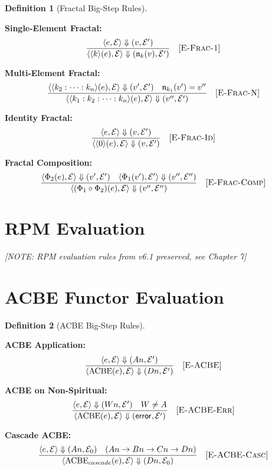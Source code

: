 \documentclass[11pt,twoside,openright]{book}
\theoremstyle{definition}
\newtheorem{definition}{Definition}[chapter]
\theoremstyle{plain}
\theoremstyle{remark}
\newcommand{\Frac}{\Phi}
\newcommand{\bigstep}{\Downarrow}
\begin{document}
\begin{definition}[Fractal Big-Step Rules]
\label{def:fractal-bigstep-complete}

\textbf{Single-Element Fractal:}
\[
\frac{\langle e, \mathcal{E} \rangle \bigstep (v, \mathcal{E}')}
{\langle \langle k \rangle(e), \mathcal{E} \rangle \bigstep (\mathfrak{n}_k(v), \mathcal{E}')} \quad [\textsc{E-Frac-1}]
\]

\textbf{Multi-Element Fractal:}
\[
\frac{\langle \langle k_2 : \cdots : k_n \rangle(e), \mathcal{E} \rangle \bigstep (v', \mathcal{E}') \quad \mathfrak{n}_{k_1}(v') = v''}
{\langle \langle k_1 : k_2 : \cdots : k_n \rangle(e), \mathcal{E} \rangle \bigstep (v'', \mathcal{E}')} \quad [\textsc{E-Frac-N}]
\]

\textbf{Identity Fractal:}
\[
\frac{\langle e, \mathcal{E} \rangle \bigstep (v, \mathcal{E}')}
{\langle \langle 0 \rangle(e), \mathcal{E} \rangle \bigstep (v, \mathcal{E}')} \quad [\textsc{E-Frac-Id}]
\]

\textbf{Fractal Composition:}
\[
\frac{\langle \Frac_2(e), \mathcal{E} \rangle \bigstep (v', \mathcal{E}') \quad \langle \Frac_1(v'), \mathcal{E}' \rangle \bigstep (v'', \mathcal{E}'')}
{\langle (\Frac_1 \circ \Frac_2)(e), \mathcal{E} \rangle \bigstep (v'', \mathcal{E}'')} \quad [\textsc{E-Frac-Comp}]
\]
\end{definition}

\section{RPM Evaluation}

\textit{[NOTE: RPM evaluation rules from v6.1 preserved, see Chapter 7]}

\section{ACBE Functor Evaluation}

\begin{definition}[ACBE Big-Step Rules]
\label{def:acbe-bigstep}

\textbf{ACBE Application:}
\[
\frac{\langle e, \mathcal{E} \rangle \bigstep (An, \mathcal{E}')}
{\langle \mathrm{ACBE}(e), \mathcal{E} \rangle \bigstep (Dn, \mathcal{E}')} \quad [\textsc{E-ACBE}]
\]

\textbf{ACBE on Non-Spiritual:}
\[
\frac{\langle e, \mathcal{E} \rangle \bigstep (Wn, \mathcal{E}') \quad W \neq A}
{\langle \mathrm{ACBE}(e), \mathcal{E} \rangle \bigstep (\mathsf{error}, \mathcal{E}')} \quad [\textsc{E-ACBE-Err}]
\]

\textbf{Cascade ACBE:}
\[
\frac{\langle e, \mathcal{E} \rangle \bigstep (An, \mathcal{E}_0) \quad (An \to Bn \to Cn \to Dn)}
{\langle \mathrm{ACBE}_{cascade}(e), \mathcal{E} \rangle \bigstep (Dn, \mathcal{E}_0)} \quad [\textsc{E-ACBE-Casc}]
\]
\end{definition}
\end{document}
